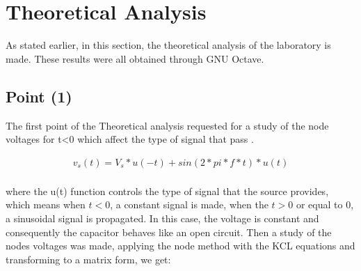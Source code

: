 \section{Theoretical Analysis}
\label{sec:analysis}

\par As stated earlier, in this section, the theoretical analysis of the laboratory is made. These results were all obtained through GNU Octave.



\subsection{Point (1)} 

\par The first point of the Theoretical analysis requested for a study of the node voltages for t<0 which affect the type of signal that pass . 

\begin{align*}  
v_s(t)=V_s*u(-t)+sin(2*pi*f*t)*u(t)\\   
\end{align*} 

where the u(t) function controls the type of signal that the source provides, which means when $t<0$, a constant signal is made, when the $t>0$ or equal to 0, a sinusoidal signal is propagated.  
In this case, the voltage is constant and consequently the capacitor behaves like an open circuit. Then a study of the nodes voltages was made, applying the node method with the KCL equations and transforming to a matrix form, we get:


